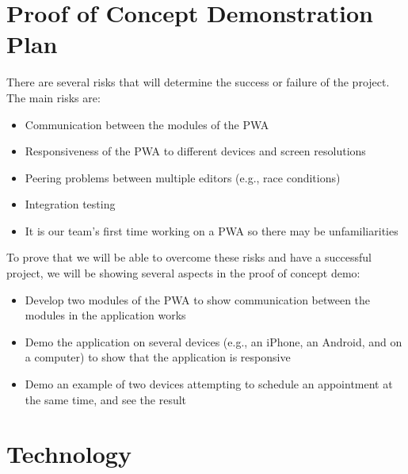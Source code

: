 \documentclass{article}
\begin{document}
\section{Proof of Concept Demonstration Plan}

There are several risks that will determine the success or failure of the project. The main risks are:

\begin{itemize}
	\item Communication between the modules of the PWA
	\item Responsiveness of the PWA to different devices and screen resolutions
	\item Peering problems between multiple editors (e.g., race conditions)
	\item Integration testing
	\item It is our team's first time working on a PWA so there may be unfamiliarities
\end{itemize}

To prove that we will be able to overcome these risks and have a successful project, we will be showing 
several aspects in the proof of concept demo:

\begin{itemize}
	\item Develop two modules of the PWA to show communication between the modules in the application works
	\item Demo the application on several devices (e.g., an iPhone, an Android, and on a computer) to show that the application is responsive
	\item Demo an example of two devices attempting to schedule an appointment at the same time, and see the result
\end{itemize}

\section{Technology}

\end{document}
